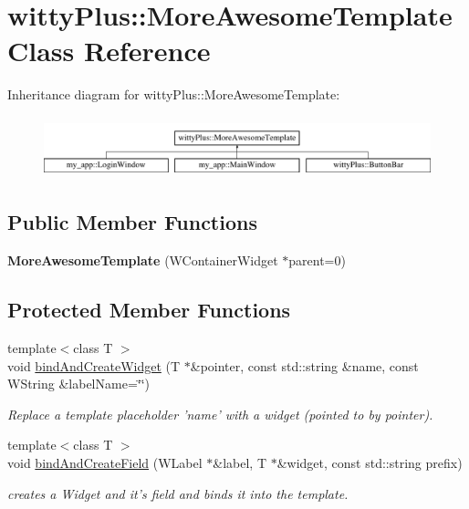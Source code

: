 \hypertarget{classwittyPlus_1_1MoreAwesomeTemplate}{
\section{wittyPlus::MoreAwesomeTemplate Class Reference}
\label{classwittyPlus_1_1MoreAwesomeTemplate}
}
Inheritance diagram for wittyPlus::MoreAwesomeTemplate:\begin{figure}[H]
\begin{center}
\leavevmode
\includegraphics[height=1.786284cm]{classwittyPlus_1_1MoreAwesomeTemplate}
\end{center}
\end{figure}
\subsection*{Public Member Functions}
\begin{DoxyCompactItemize}
\item 
\hypertarget{classwittyPlus_1_1MoreAwesomeTemplate_a5e9b42e5ed9fdb7e60274524f66bbc5f}{
{\bfseries MoreAwesomeTemplate} (WContainerWidget $\ast$parent=0)}
\label{classwittyPlus_1_1MoreAwesomeTemplate_a5e9b42e5ed9fdb7e60274524f66bbc5f}

\end{DoxyCompactItemize}
\subsection*{Protected Member Functions}
\begin{DoxyCompactItemize}
\item 
{\footnotesize template$<$class T $>$ }\\void \hyperlink{classwittyPlus_1_1MoreAwesomeTemplate_a910a90126797fcfcbcb48a081fbac476}{bindAndCreateWidget} (T $\ast$\&pointer, const std::string \&name, const WString \&labelName=\char`\"{}\char`\"{})
\begin{DoxyCompactList}\small\item\em Replace a template placeholder 'name' with a widget (pointed to by pointer). \item\end{DoxyCompactList}\item 
{\footnotesize template$<$class T $>$ }\\void \hyperlink{classwittyPlus_1_1MoreAwesomeTemplate_ad083d6afd50d479d70682f048e065d47}{bindAndCreateField} (WLabel $\ast$\&label, T $\ast$\&widget, const std::string prefix)
\begin{DoxyCompactList}\small\item\em creates a Widget and it's field and binds it into the template. \item\end{DoxyCompactList}\end{DoxyCompactItemize}


